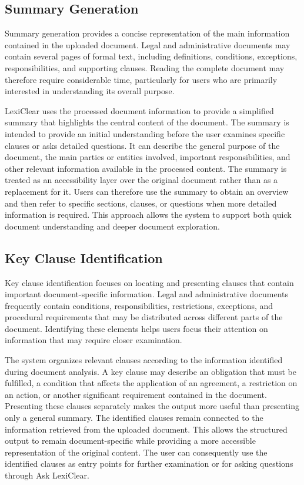 \documentclass[12pt,a4paper,oneside]{report}
\begin{document}
\subsection{Summary Generation}

Summary generation provides a concise representation of the main information contained in the uploaded document. Legal and administrative documents may contain several pages of formal text, including definitions, conditions, exceptions, responsibilities, and supporting clauses. Reading the complete document may therefore require considerable time, particularly for users who are primarily interested in understanding its overall purpose.

LexiClear uses the processed document information to provide a simplified summary that highlights the central content of the document. The summary is intended to provide an initial understanding before the user examines specific clauses or asks detailed questions. It can describe the general purpose of the document, the main parties or entities involved, important responsibilities, and other relevant information available in the processed content. The summary is treated as an accessibility layer over the original document rather than as a replacement for it. Users can therefore use the summary to obtain an overview and then refer to specific sections, clauses, or questions when more detailed information is required. This approach allows the system to support both quick document understanding and deeper document exploration.

\subsection{Key Clause Identification}

Key clause identification focuses on locating and presenting clauses that contain important document-specific information. Legal and administrative documents frequently contain conditions, responsibilities, restrictions, exceptions, and procedural requirements that may be distributed across different parts of the document. Identifying these elements helps users focus their attention on information that may require closer examination.

The system organizes relevant clauses according to the information identified during document analysis. A key clause may describe an obligation that must be fulfilled, a condition that affects the application of an agreement, a restriction on an action, or another significant requirement contained in the document. Presenting these clauses separately makes the output more useful than presenting only a general summary. The identified clauses remain connected to the information retrieved from the uploaded document. This allows the structured output to remain document-specific while providing a more accessible representation of the original content. The user can consequently use the identified clauses as entry points for further examination or for asking questions through Ask LexiClear.
\end{document}
